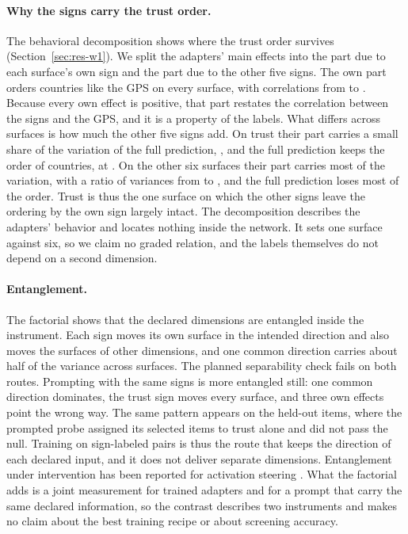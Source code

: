\paragraph{Why the signs carry the trust order.} The behavioral decomposition shows where the trust order survives (Section~\ref{sec:res-w1}). We split the adapters' main effects into the part due to each surface's own sign and the part due to the other five signs. The own part orders countries like the GPS on every surface, with correlations from  to . Because every own effect is positive, that part restates the correlation between the signs and the GPS, and it is a property of the labels. What differs across surfaces is how much the other five signs add. On trust their part carries a small share of the variation of the full prediction, , and the full prediction keeps the order of countries, at . On the other six surfaces their part carries most of the variation, with a ratio of variances from  to , and the full prediction loses most of the order. Trust is thus the one surface on which the other signs leave the ordering by the own sign largely intact. The decomposition describes the adapters' behavior and locates nothing inside the network. It sets one surface against six, so we claim no graded relation, and the labels themselves do not depend on a second dimension.

\paragraph{Entanglement.} The factorial shows that the declared dimensions are entangled inside the instrument. Each sign moves its own surface in the intended direction and also moves the surfaces of other dimensions, and one common direction carries about half of the variance across surfaces. The planned separability check fails on both routes. Prompting with the same signs is more entangled still: one common direction dominates, the trust sign moves every surface, and three own effects point the wrong way. The same pattern appears on the held-out items, where the prompted probe assigned its selected items to trust alone and did not pass the null. Training on sign-labeled pairs is thus the route that keeps the direction of each declared input, and it does not deliver separate dimensions. Entanglement under intervention has been reported for activation steering \citep{dangmasud2026}. What the factorial adds is a joint measurement for trained adapters and for a prompt that carry the same declared information, so the contrast describes two instruments and makes no claim about the best training recipe or about screening accuracy.

